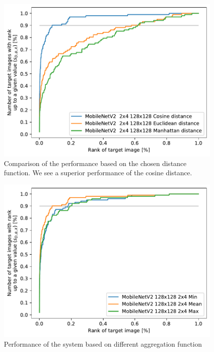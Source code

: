 \begin{figure}
    \centering
    \includegraphics[width=0.8\linewidth]{graphs/3aab502ea602a9f49afaa0a0d998cf226a0a67b9efcaa655d2ddf5063eeabe47.pdf}
    \caption{Comparison of the performance based on the chosen distance function. We see a superior performance of the cosine distance.}
    \label{fig:regions_distances}
\end{figure}

\begin{figure}
\centering
\includegraphics[width=0.8\linewidth]{graphs/70c56dc52be92e048f57b9bdfb35ddce2be41fd2454ae360588da2e387b09de5.pdf}
\caption{Performance of the system based on different aggregation function}
\label{fig:ranking_funcs}
\end{figure}

